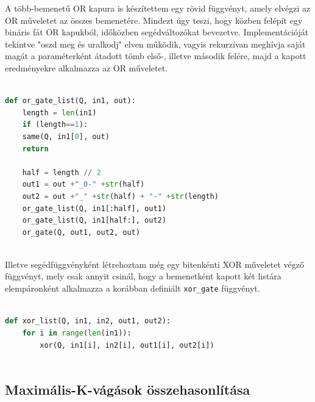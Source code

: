 A több-bemenetű OR kapura is készítettem egy rövid függvényt, amely elvégzi az OR műveletet az összes bemenetére. Mindezt úgy teszi, hogy közben felépít egy bináris fát OR kapukból, időközben segédváltozókat bevezetve. Implementációját tekintve "oszd meg és uralkodj" elven működik, vagyis rekurzívan meghívja saját magát a paraméterként átadott tömb első-, illetve második felére, majd a kapott eredményekre alkalmazza az OR műveletet.

\begin{lstlisting}[language=python,caption=Elemi kapuk,label=code:MultipleOrGates]
	
def or_gate_list(Q, in1, out):
	length = len(in1)
	if (length==1):
	same(Q, in1[0], out)
	return
	
	half = length // 2
	out1 = out +"_0-" +str(half)  
	out2 = out +"_" +str(half) + "-" +str(length)
	or_gate_list(Q, in1[:half], out1)
	or_gate_list(Q, in1[half:], out2)
	or_gate(Q, out1, out2, out)
	
\end{lstlisting}

Illetve segédfüggvényként létrehoztam még egy bitenkénti XOR műveletet végző függvényt, mely csak annyit csinál, hogy a bemenetként kapott két listára elempáronként alkalmazza a korábban definiált \verb+xor_gate+ függvényt.

\begin{lstlisting}[language=python,caption=Elemi kapuk,label=code:XorGateList]
	
def xor_list(Q, in1, in2, out1, out2):
	for i in range(len(in1)):
		xor(Q, in1[i], in2[i], out1[i], out2[i])
	
\end{lstlisting}

\subsection{Maximális-K-vágások összehasonlítása}

